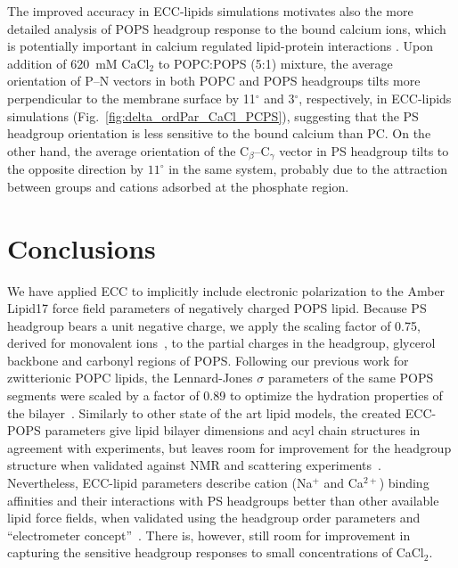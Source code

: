 \documentclass[journal=jctcce,manuscript=article]{achemso}
\begin{document}
The improved accuracy in ECC-lipids simulations motivates also the more detailed analysis of
POPS headgroup response to the bound calcium ions, which is potentially important in calcium regulated
lipid-protein interactions \cite{leventis10}.
Upon addition of 620~mM CaCl$_2$ to POPC:POPS (5:1) mixture,
the average orientation of P--N vectors in both POPC and POPS headgroups tilts more perpendicular to the membrane surface
by 11$^\circ$ and  3$^\circ$, respectively, in ECC-lipids simulations (Fig.~\ref{fig:delta_ordPar_CaCl_PCPS}),
suggesting that the PS headgroup orientation is less sensitive to the bound calcium than PC.
On the other hand, the average orientation of the C$_{\beta}$--C$_{\gamma}$ vector in PS headgroup
tilts to the opposite direction by $11^\circ$ in the same system, probably
due to the attraction between  groups and cations adsorbed at the phosphate region.



\section{Conclusions} 
We have applied ECC to implicitly include electronic polarization to the Amber Lipid17 force field
parameters of negatively charged POPS lipid.
Because PS headgroup bears a unit negative charge, we apply the scaling factor of 0.75,
derived for monovalent ions~\cite{leontyev09}, to the partial charges
in the headgroup, glycerol backbone and carbonyl regions of POPS.
Following our previous work for zwitterionic POPC lipids, the 
Lennard-Jones $\sigma$ parameters of the same POPS segments were
scaled by a factor of 0.89 to optimize the hydration properties of the bilayer~\cite{melcr18}.
Similarly to other state of the art lipid models, the created ECC-POPS parameters give
lipid bilayer dimensions and acyl chain structures in agreement with experiments,
but leaves room for improvement for the headgroup structure when validated against
NMR and scattering experiments~\cite{botan15,ollila16}.
Nevertheless, ECC-lipid parameters describe cation (Na$^+$ and Ca$^{2+}$) binding affinities
and their interactions with PS headgroups better than other available lipid force fields,
when validated using the headgroup order parameters and ``electrometer concept''~\cite{NMRlipidsIV}.
There is, however, still room for improvement in capturing the sensitive headgroup responses to 
small concentrations of CaCl$_2$.
\end{document}
